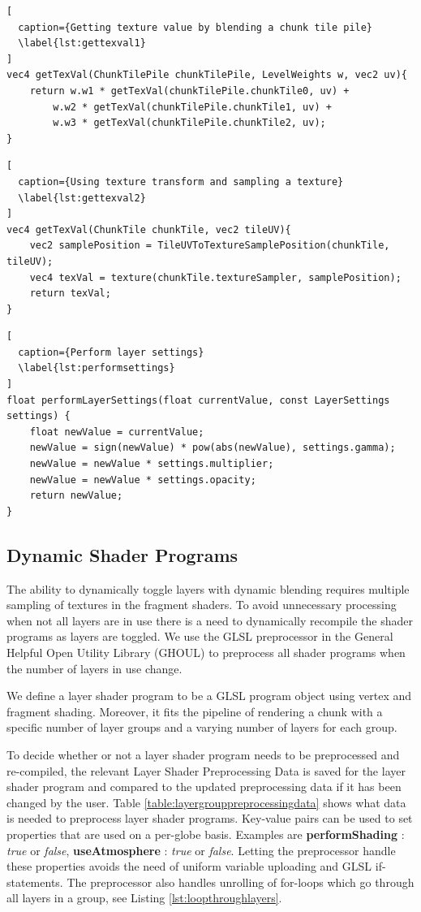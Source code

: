 \begin{lstlisting}[
  caption={Getting texture value by blending a chunk tile pile} 
  \label{lst:gettexval1}
]
vec4 getTexVal(ChunkTilePile chunkTilePile, LevelWeights w, vec2 uv){
	return w.w1 * getTexVal(chunkTilePile.chunkTile0, uv) + 
		w.w2 * getTexVal(chunkTilePile.chunkTile1, uv) + 
		w.w3 * getTexVal(chunkTilePile.chunkTile2, uv);
}
\end{lstlisting}

\begin{lstlisting}[
  caption={Using texture transform and sampling a texture} 
  \label{lst:gettexval2}
]
vec4 getTexVal(ChunkTile chunkTile, vec2 tileUV){
	vec2 samplePosition = TileUVToTextureSamplePosition(chunkTile, tileUV);
	vec4 texVal = texture(chunkTile.textureSampler, samplePosition);
	return texVal;
}
\end{lstlisting}


\begin{lstlisting}[
  caption={Perform layer settings} 
  \label{lst:performsettings}
]
float performLayerSettings(float currentValue, const LayerSettings settings) {
	float newValue = currentValue;
	newValue = sign(newValue) * pow(abs(newValue), settings.gamma);
	newValue = newValue * settings.multiplier;
	newValue = newValue * settings.opacity;
	return newValue;
}
\end{lstlisting}

\subsection{Dynamic Shader Programs}

The ability to dynamically toggle layers with dynamic blending requires multiple sampling of textures in the fragment shaders. To avoid unnecessary processing when not all layers are in use there is a need to dynamically recompile the shader programs as layers are toggled. We use the GLSL preprocessor in the General Helpful Open Utility Library (GHOUL) \cite{ghoul} to preprocess all shader programs when the number of layers in use change.

We define a layer shader program to be a GLSL program object using vertex and fragment shading. Moreover, it fits the pipeline of rendering a chunk with a specific number of layer groups and a varying number of layers for each group.

To decide whether or not a layer shader program needs to be preprocessed and re-compiled, the relevant Layer Shader Preprocessing Data is saved for the layer shader program and compared to the updated preprocessing data if it has been changed by the user. Table \ref{table:layergrouppreprocessingdata} shows what data is needed to preprocess layer shader programs. Key-value pairs can be used to set properties that are used on a per-globe basis. Examples are \textbf{performShading} : \emph{true} or \emph{false}, \textbf{useAtmosphere} : \emph{true} or \emph{false}. Letting the preprocessor handle these properties avoids the need of uniform variable uploading and GLSL if-statements. The preprocessor also handles unrolling of for-loops which go through all layers in a group, see Listing \ref{lst:loopthroughlayers}.



